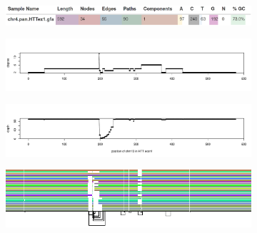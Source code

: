 \begin{figure}[ht!]
	\begin{subfigure}{\linewidth}
		\caption{}
		\centering
		\includegraphics[width=1.0\linewidth, trim=-2.25cm 1cm 0cm 2.75cm]{fig/metrics/chr4_pan_HTTex1_gfa_multiqc_odgi_stats}
		\label{fig:metrics-multiqc}
	\end{subfigure}
	\begin{subfigure}{1\linewidth}
	\caption{}
	\centering
	\includegraphics[width=\linewidth,trim=+.225cm 3cm +.425cm +3cm]{fig/metrics/chr4_HTT_chm13_degree_w1_bed}
	\label{fig:metrics-degree}
	\end{subfigure}
	\begin{subfigure}{\linewidth}
	\caption{}
	\centering
	\includegraphics[width=\linewidth,trim=+.225cm 3cm +0.425cm +3cm]{fig/metrics/chr4_HTT_chm13_depth_w1_bed}
	\label{fig:metrics-depth}
	\end{subfigure}
	\begin{subfigure}{\linewidth}
		\caption{}
		\centering
		\includegraphics[width=1.0\linewidth, trim=-1.95cm 2cm -1.0cm 0.5cm]{fig/metrics/chr4_pan_fa_a2fb268_e820cd3_9ea71d8_smooth_gfa_og_HTTex1_og_O_og_tiny_og}
		\label{fig:metrics-viz}
	\end{subfigure}
	\begin{subfigure}{\linewidth}

\end{subfigure}
\end{figure}
